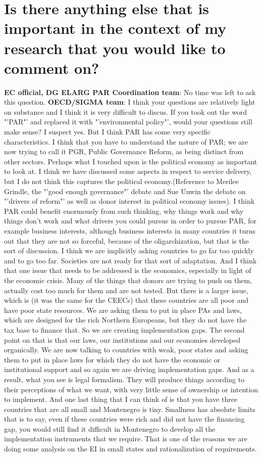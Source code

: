 \section{Is there anything else that is important in the context of my research that you would like to comment on? }
\label{sec:comment on}
\textbf{EC official, DG ELARG PAR Coordination team}: No time was left to ask this question.
\textbf{OECD/SIGMA team}: I think your questions are relatively light on substance and I think it is very difficult to discus. If you took out the word "'PAR"' and replaced it with "'environmental policy"', would your questions still make sense? I suspect yes. But I think PAR has some very specific characteristics. I think that you have to understand the nature of PAR; we are now trying to call it PGR, Public Governance Reform, as being distinct from other sectors. Perhaps what I touched upon is the political economy as important to look at. I think we have discussed some aspects in respect to service delivery, but I do not think this captures the political economy.(Reference to Merilee Grindle, the "'good enough governance"' debate and Sue Unwin the debate on "'drivers of reform"' as well as donor interest in political economy issues). I think PAR could benefit enormously from such thinking, why things work and why things don't work and what drivers you could pursue in order to pursue PAR, for example business interests, although business interests in many countries it turns out that they are not so forceful, because of the oligarchization, but that is the sort of discussion. I think we are implicitly asking countries to go far too quickly and to go too far. Societies are not ready for that sort of adaptation. And I think that one issue that needs to be addressed is the economics, especially in light of the economic crisis. Many of the things that donors are trying to push on them, actually cost too much for them and are not tested. But there is a larger issue, which is (it was the same for the CEECs) that these countries are all poor and have poor state resources. We are asking them to put in place PAs and laws, which are designed for the rich Northern Europeans, but they do not have the tax base to finance that. So we are creating implementation gaps. The second point on that is that our laws, our institutions and our economies developed organically. We are now talking to countries with weak, poor states and asking them to put in place laws for which they do not have the economic or institutional support and so again we are driving implementation gaps. And as a result, what you see is legal formalism. They will produce things according to their perceptions of what we want, with very little sense of ownership or intention to implement. And one last thing that I can think of is that you have three countries that are all small and Montenegro is tiny. Smallness has absolute limits that is to say, even if these countries were rich and did not have the financing gap, you would still find it difficult in Montenegro to develop all the implementation instruments that we require. That is one of the reasons we are doing some analysis on the EI in small states and rationalization of requirements.\\ 
